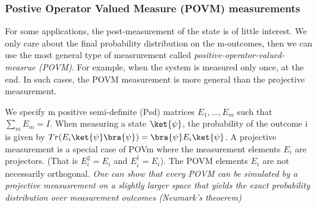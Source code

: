 \documentclass[12pt, oneside]{book}
\theoremstyle{definition}
\theoremstyle{definition}
\theoremstyle{remark}
\begin{document}
\subsubsection{Postive Operator Valued Measure (POVM) measurements}
For some applications, the post-measurement of the state is of little interest. We only care about the final probability distribution 
on the m-outcomes, then we can use the most general type of measrurement called \textit{positive-operator-valued-measrue (POVM)}. For example,
when the system is measured only once, at the end. In such cases, the POVM measurement is more general than the projective measurement.

We specify m positive semi-definite (Psd) matrices $E_1,\ldots,E_m$ such that $\sum_m E_m=I$. When measuring a state 
$\ket{\psi}$, the probability of the outcome i is given by $Tr(E_i\ket{\psi}\bra{\psi}) = \bra{\psi}E_i\ket{\psi}$. A projective measurement is a special case of POVm where the 
measurement elements $E_i$ are projectors. (That is $E_i^2=E_i$ and $E_i^{\dagger}=E_i$). The POVM elements $E_i$ are not necessarily orthogonal. 
\textit{One can show that every POVM can be simulated by a projective measusrement on a slightly larger space that yields the exact probability distribution over measurement outcomes (Neumark's theoerem)}
\end{document}

